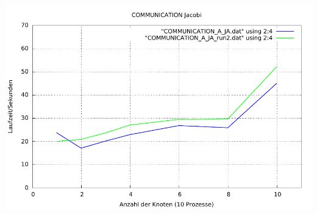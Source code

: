 \documentclass[a4paper]{article}
\begin{document}
\includegraphics[scale=0.8]{img/COMMUNICATION_JA_laufzeit.pdf}
\end{document}
